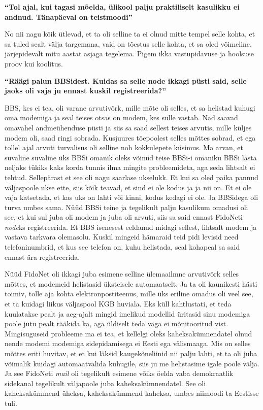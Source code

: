 \textbf{\enquote{Tol ajal, kui tagasi mõelda, ülikool palju praktiliselt kasulikku ei andnud. Tänapäeval on teistmoodi}}

No nii nagu kõik ütlevad, et  ta oli selline ta ei olnud mitte tempel selle kohta, et sa tuled sealt välja targemana, vaid on tõestus selle kohta, et sa oled võimeline, järjepidevalt mitu aastat asjaga tegelema. Pigem ikka vastupidavuse ja hoolsuse proov kui koolitus.

\textbf{\enquote{Räägi palun BBSidest. Kuidas sa selle node ikkagi püsti said, selle jaoks oli vaja ju ennast kuskil registreerida?}}

BBS, kes ei tea, oli varane  arvutivõrk, mille mõte oli selles, et sa helistad kuhugi oma modemiga ja seal teises otsas on modem, kes sulle vastab. Nad saavad omavahel andmeühenduse püsti ja siis sa saad sellest teises arvutis, mille küljes modem oli, saad ringi sobrada. Kusjuures tõepoolest selles mõttes sobrad, et ega tollel ajal arvuti turvalisus oli selline noh kokkulepete küsimus. Ma arvan, et suvaline suvaline üks BBSi omanik oleks võinud teise BBSi-i omaniku BBSi lasta neljaks tükiks kaks korda tunnis ilma mingite probleemideta, aga seda lihtsalt ei tehtud.  Sellepärast et see oli nagu saarlase ukselukk. Et kui sa oled paika pannud väljaspoole ukse ette, siis kõik teavad, et sind ei ole kodus ja ja nii on. Et ei ole vaja katsetada, et kas uks on lahti või kinni, kodus kedagi ei ole. Ja BBSidega oli  turva umbes sama. Nüüd BBSi teine ja tegelikult palju kasulikum omadusi oli see, et kui sul juba oli modem ja juba oli arvuti, siis sa said ennast FidoNeti \emph{node}ks registreerida. Et BBS isenesest eeldanud midagi sellest, lihtsalt modem ja vastava tarkvara olemasolu. Kuskil mingeid hämaraid teid pidi levisid need telefoninumbrid, et kus see  telefon on, kuhu helistada, seal kohapeal sa said ennast ära registreerida.

Nüüd FidoNet oli ikkagi juba esimene selline ülemaailmne arvutivõrk selles mõttes, et modemeid helistasid üksteisele automaatselt. Ja ta oli kaunikesti hästi toimiv,  tolle aja kohta elektronpostiteenus, mille üks  eriline omadus oli veel see, et ta kuidagi liikus väljaspool KGB huviala. Eks küll kahtlustati, et teda kuulatakse pealt ja aeg-ajalt mingid imelikud modellid üritasid sinu modemiga poole jutu pealt rääkida ka, aga üldiselt teda väga ei mõnitooritud vist. Mingisuguseid probleeme ma ei tea, et kellelgi oleks kaheksakümnendatel olnud nende modemi modemiga sidepidamisega ei Eesti ega välismaaga. Mis on selles mõttes eriti huvitav, et et kui läksid kaugekõneliinid nii palju lahti, et ta oli juba võimalik kuidagi automaatvalida kuhugile, siis ju me helistasime igale poole välja. Ja see FidoNeti \emph{mail} oli tegelikult  esimene võiks öelda vaba demokraatlik sidekanal tegelikult väljapoole juba kaheksakümnendatel. See oli kaheksakümmend üheksa, kaheksakümmend kaheksa, umbes niimoodi ta Eestisse tuli.

